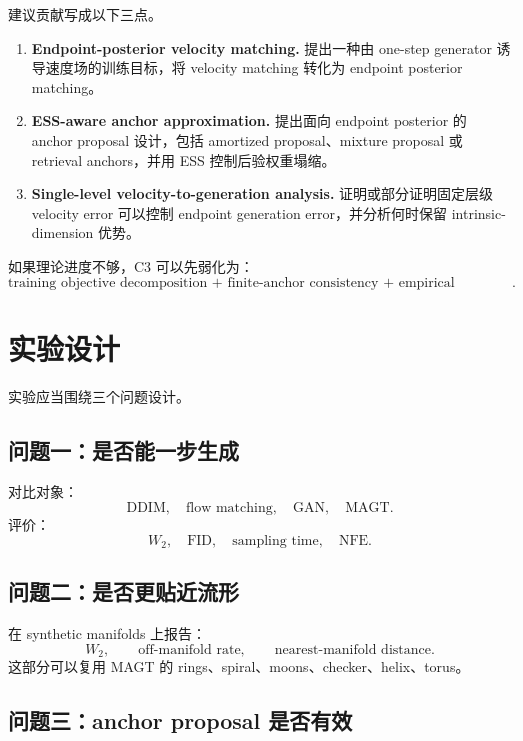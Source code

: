 \documentclass[UTF8,11pt]{ctexart}
\begin{document}
建议贡献写成以下三点。

\begin{enumerate}[label=\textbf{C\arabic*.}]
\item \textbf{Endpoint-posterior velocity matching.}
提出一种由 one-step generator 诱导速度场的训练目标，将 velocity matching 转化为 endpoint posterior matching。

\item \textbf{ESS-aware anchor approximation.}
提出面向 endpoint posterior 的 anchor proposal 设计，包括 amortized proposal、mixture proposal 或 retrieval anchors，并用 ESS 控制后验权重塌缩。

\item \textbf{Single-level velocity-to-generation analysis.}
证明或部分证明固定层级 velocity error 可以控制 endpoint generation error，并分析何时保留 intrinsic-dimension 优势。
\end{enumerate}

如果理论进度不够，C3 可以先弱化为：
\[
\text{training objective decomposition + finite-anchor consistency + empirical validation}.
\]

\section{实验设计}

实验应当围绕三个问题设计。

\subsection{问题一：是否能一步生成}

对比对象：
\[
\text{DDIM},\quad \text{flow matching},\quad \text{GAN},\quad \text{MAGT}.
\]
评价：
\[
W_2,\quad \text{FID},\quad \text{sampling time},\quad \text{NFE}.
\]

\subsection{问题二：是否更贴近流形}

在 synthetic manifolds 上报告：
\[
W_2,\qquad \text{off-manifold rate},\qquad \text{nearest-manifold distance}.
\]
这部分可以复用 MAGT 的 rings、spiral、moons、checker、helix、torus。

\subsection{问题三：anchor proposal 是否有效}
\end{document}
